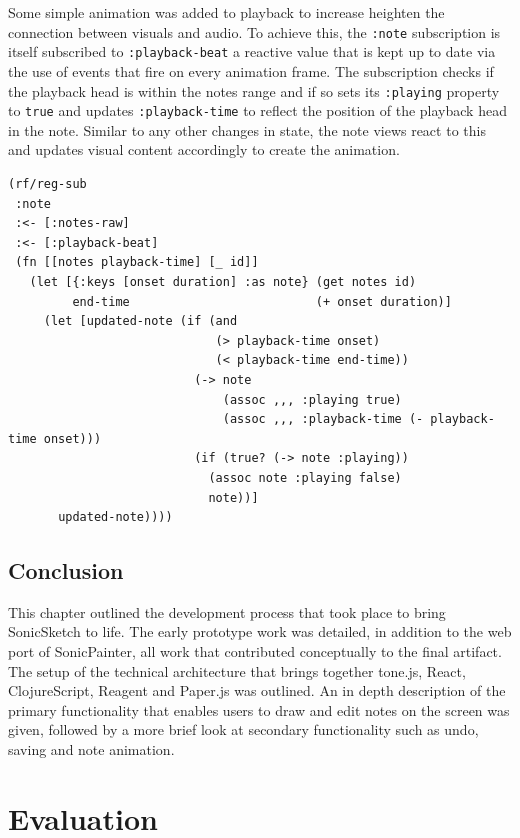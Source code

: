 \documentclass[12pt]{report}
\begin{document}
Some simple animation was added to playback to increase heighten the connection
between visuals and audio. To achieve this, the \texttt{:note} subscription is itself
subscribed to \texttt{:playback-beat} a reactive value that is kept up to date via the
use of events that fire on every animation frame. The subscription checks if the
playback head is within the notes range and if so sets its \texttt{:playing} property
to \texttt{true} and updates \texttt{:playback-time} to reflect the position of the playback
head in the note. Similar to any other changes in state, the note views react to
this and updates visual content accordingly to create the animation.
\begin{footnotesize}
\begin{verbatim}
(rf/reg-sub
 :note
 :<- [:notes-raw]
 :<- [:playback-beat]
 (fn [[notes playback-time] [_ id]]
   (let [{:keys [onset duration] :as note} (get notes id)
         end-time                          (+ onset duration)]
     (let [updated-note (if (and
                             (> playback-time onset)
                             (< playback-time end-time))
                          (-> note
                              (assoc ,,, :playing true)
                              (assoc ,,, :playback-time (- playback-time onset)))
                          (if (true? (-> note :playing))
                            (assoc note :playing false)
                            note))]
       updated-note))))
\end{verbatim}
\end{footnotesize}

\chapter{Conclusion}
\label{sec:org2d6b8d0}
This chapter outlined the development process that took place to bring
SonicSketch to life. The early prototype work was detailed, in addition to the
web port of SonicPainter, all work that contributed conceptually to the final
artifact. The setup of the technical architecture that brings together tone.js,
React, ClojureScript, Reagent and Paper.js was outlined. An in depth description
of the primary functionality that enables users to draw and edit notes on the
screen was given, followed by a more brief look at secondary functionality such
as undo, saving and note animation.


\newpage
\part{Evaluation}
\label{sec:org3d36c3f}
\end{document}
